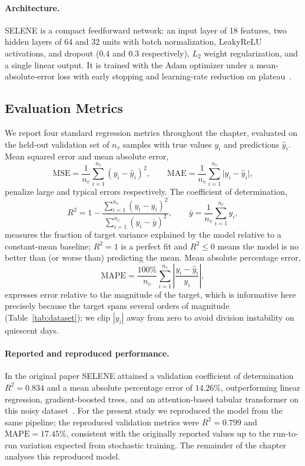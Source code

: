 \documentclass[graybox]{SNmult}
\begin{document}
\paragraph{Architecture.}
SELENE is a compact feedforward network: an input layer of 18 features, two
hidden layers of 64 and 32 units with batch normalization, LeakyReLU
activations, and dropout ($0.4$ and $0.3$ respectively), $L_2$ weight
regularization, and a single linear output. It is trained with the Adam
optimizer under a mean-absolute-error loss with early stopping and
learning-rate reduction on plateau~\cite{tummala2025selene}.

\subsection{Evaluation Metrics}
\label{sec:metrics}
We report four standard regression metrics throughout the chapter, evaluated on
the held-out validation set of $n_v$ samples with true values $y_i$ and
predictions $\hat{y}_i$. Mean squared error and mean absolute error,
\begin{equation}
  \mathrm{MSE} = \frac{1}{n_v}\sum_{i=1}^{n_v} (y_i - \hat{y}_i)^2,
  \qquad
  \mathrm{MAE} = \frac{1}{n_v}\sum_{i=1}^{n_v} \lvert y_i - \hat{y}_i \rvert,
  \label{eq:mse-mae}
\end{equation}
penalize large and typical errors respectively. The coefficient of
determination,
\begin{equation}
  R^2 = 1 - \frac{\sum_{i=1}^{n_v} (y_i - \hat{y}_i)^2}
                 {\sum_{i=1}^{n_v} (y_i - \bar{y})^2},
  \qquad \bar{y} = \frac{1}{n_v}\sum_{i=1}^{n_v} y_i,
  \label{eq:r2}
\end{equation}
measures the fraction of target variance explained by the model relative to a
constant-mean baseline; $R^2 = 1$ is a perfect fit and $R^2 \le 0$ means the
model is no better than (or worse than) predicting the mean. Mean absolute
percentage error,
\begin{equation}
  \mathrm{MAPE} = \frac{100\%}{n_v}\sum_{i=1}^{n_v}
    \left\lvert \frac{y_i - \hat{y}_i}{y_i} \right\rvert,
  \label{eq:mape}
\end{equation}
expresses error relative to the magnitude of the target, which is informative
here precisely because the target spans several orders of magnitude
(Table~\ref{tab:dataset}); we clip $|y_i|$ away from zero to avoid division
instability on quiescent days.

\paragraph{Reported and reproduced performance.}
In the original paper SELENE attained a validation coefficient of determination
$R^2 = 0.834$ and a mean absolute percentage error of $14.26\%$, outperforming
linear regression, gradient-boosted trees, and an attention-based tabular
transformer on this noisy dataset~\cite{tummala2025selene}. For the present study
we reproduced the model from the same pipeline; the reproduced validation
metrics were $R^2 = 0.799$ and $\mathrm{MAPE} = 17.45\%$,
consistent with the originally reported values up to the run-to-run variation
expected from stochastic training. The remainder of the chapter analyses this
reproduced model.
\end{document}
